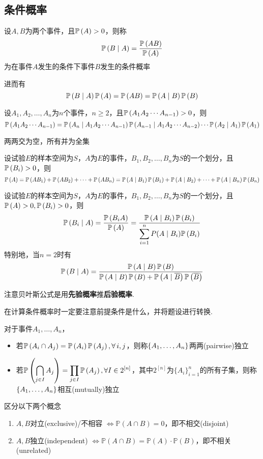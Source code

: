 \subsection{条件概率}
\begin{definition}[条件概率]
设$A,B$为两个事件，且$\mathbb{P}\left(A\right)>0$，则称
\[\mathbb{P}\left(B\mid A\right)=\dfrac{\mathbb{P}\left(AB\right)}{\mathbb{P}\left(A\right)}\]
为在事件$A$发生的条件下事件$B$发生的条件概率
\end{definition}
进而有
\[\mathbb{P}\left(B\mid A\right)\mathbb{P}\left(A\right)=\mathbb{P}\left(AB\right)=\mathbb{P}\left(A\mid B\right)\mathbb{P}\left(B\right)\]
\begin{theorem}[乘法公式]
设$A_1,A_2,\ldots,A_n$为$n$个事件，$n\geq 2$，且$\mathbb{P}\left(A_1A_2\cdots A_{n-1}\right)>0$，则
\[\mathbb{P}\left(A_1A_2\cdots A_{n-1}\right)=\mathbb{P}\left(A_n\mid A_1A_2\cdots A_{n-1}\right)\mathbb{P}\left(A_{n-1}\mid A_1A_2\cdots A_{n-2}\right)\cdots\mathbb{P}\left(A_2\mid A_1\right)\mathbb{P}\left(A_1\right)\]
\end{theorem}
\begin{definition}[划分]
两两交为空，所有并为全集
\end{definition}
\begin{theorem}[全概率公式]
设试验$E$的样本空间为$S$，$A$为$E$的事件，$B_1,B_2,\ldots,B_n$为$S$的一个划分，且$\mathbb{P}\left(B_i\right)>0$，则
\[\mathbb{P}\left(A\right)=\mathbb{P}\left(AB_1\right)+\mathbb{P}\left(AB_2\right)+\cdots+\mathbb{P}\left(AB_n\right)=\mathbb{P}\left(A\mid B_1\right)\mathbb{P}\left(B_1\right)+\mathbb{P}\left(A\mid B_2\right)+\cdots+\mathbb{P}\left(A\mid B_n\right)\mathbb{P}\left(B_n\right)\]
\end{theorem}
\begin{theorem}
设试验$E$的样本空间为$S$，$A$为$E$的事件，$B_1,B_2,\ldots,B_n$为$S$的一个划分，且$\mathbb{P}\left(A\right)>0,\mathbb{P}\left(B_i\right)>0$，则
\[\mathbb{P}\left(B_i\mid A\right)=\frac{\mathbb{P}\left(B_iA\right)}{\mathbb{P}\left(A\right)}=\frac{\mathbb{P}\left(A\mid B_i\right)\mathbb{P}\left(B_i\right)}{\displaystyle\sum_{i=1}^nP(A\mid B_i)\mathbb{P}\left(B_i\right)}\]
特别地，当$n=2$时有
\[\mathbb{P}\left(B\mid A\right)=\dfrac{\mathbb{P}\left(A\mid B\right)\mathbb{P}\left(B\right)}{\mathbb{P}\left(A\mid B\right)\mathbb{P}\left(B\right)+\mathbb{P}\left(A\mid \mathop{\overline{B}}\right)\mathbb{P}\left(\mathop{\overline{B}}\right)}\]
\end{theorem}
\par 注意贝叶斯公式是用\textbf{先验概率}推\textbf{后验概率}.
\par 在计算条件概率时一定要注意前提条件是什么，并将题设进行转换.
\begin{definition}[独立性]
\rm 对于事件$A_1,\ldots,A_n$，
\begin{itemize}
	\item 若$\mathbb{P}\left(A_i\cap A_j\right)=\mathbb{P}\left(A_i\right)\mathbb{P}\left(A_j\right),\forall\,i,j$，则称$\{A_1,\dots,A_n\}$两两(pairwise)独立
	\item 若$\displaystyle\mathbb{P}\left(\bigcap_{j\in I}A_j\right)=\prod_{j\in I}\mathbb{P}\left(A_j\right),\forall I\in 2^{[n]}$，其中$2^{[n]}$为$\{A_i\}_{i=1}^n$的所有子集，则称$\{A_1,\dots,A_n\}$相互(mutually)独立
\end{itemize}
\end{definition}
\par 区分以下两个概念
\begin{enumerate}
	\item $A,B$对立(exclusive)/不相容 $\Leftrightarrow \mathbb{P}(A\cap B)=0$，即不相交(disjoint)
	\item $A,B$独立(independent) $\Leftrightarrow \mathbb{P}(A\cap B)=\mathbb{P}(A)\cdot\mathbb{P}(B)$，即不相关(unrelated)
\end{enumerate}